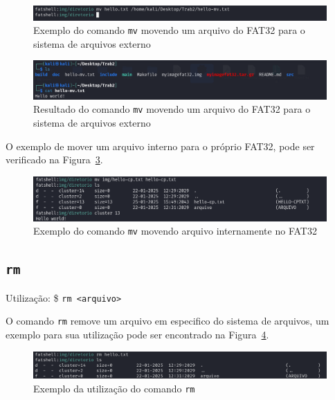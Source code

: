 \documentclass[
    12pt,				%
    oneside,   	        %
    a4paper,			%
    english,			%
    french,				%
    spanish,			%
    brazil,				%
    ]{pacotes/abntex2}
\begin{document}
\begin{figure}[H]
    \centering
    \includegraphics[width=450pt]{figuras/resultados/13-mv-interno-externo.PNG}
    \caption{Exemplo do comando \texttt{mv} movendo um arquivo do FAT32 para o sistema de arquivos externo}
    \label{fig:mv-interno-externo}
\end{figure}

\begin{figure}[H]
    \centering
    \includegraphics[width=450pt]{figuras/resultados/14-mv-externo-validacao.PNG}
    \caption{Resultado do comando \texttt{mv} movendo um arquivo do FAT32 para o sistema de arquivos externo}
    \label{fig:mv-externo-validacao}
\end{figure}

O exemplo de mover um arquivo interno para o próprio FAT32, pode ser verificado na Figura~\ref{fig:mv-interno}.

\begin{figure}[H]
    \centering
    \includegraphics[width=450pt]{figuras/resultados/18-mv-interno-interno.PNG}
    \caption{Exemplo do comando \texttt{mv} movendo arquivo internamente no FAT32}
    \label{fig:mv-interno}
\end{figure}


\subsection{\texttt{rm}}
\label{subsec:rm}
Utilização: \$ \texttt{rm <arquivo>}

O comando \texttt{rm} remove um arquivo em especifico do sistema de arquivos, um exemplo para sua utilização pode ser encontrado na Figura~\ref{fig:rm}.

\begin{figure}[H]
    \centering
    \includegraphics[width=450pt]{figuras/resultados/16-rm.PNG}
    \caption{Exemplo da utilização do comando \texttt{rm}}
    \label{fig:rm}
\end{figure}
\end{document}
